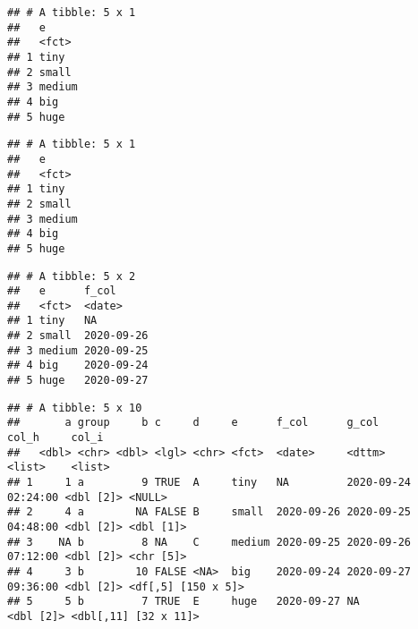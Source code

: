 \documentclass[
]{book}
\newenvironment{Shaded}{\begin{snugshade}}{\end{snugshade}}
\newcommand{\KeywordTok}[1]{\textcolor[rgb]{0.13,0.29,0.53}{\textbf{#1}}}
\newcommand{\NormalTok}[1]{#1}
\newcommand{\OperatorTok}[1]{\textcolor[rgb]{0.81,0.36,0.00}{\textbf{#1}}}
\newcommand{\StringTok}[1]{\textcolor[rgb]{0.31,0.60,0.02}{#1}}
\begin{document}
\begin{verbatim}
## # A tibble: 5 x 1
##   e     
##   <fct> 
## 1 tiny  
## 2 small 
## 3 medium
## 4 big   
## 5 huge
\end{verbatim}

\begin{Shaded}
\end{Shaded}

\begin{verbatim}
## # A tibble: 5 x 1
##   e     
##   <fct> 
## 1 tiny  
## 2 small 
## 3 medium
## 4 big   
## 5 huge
\end{verbatim}

\begin{Shaded}
\end{Shaded}

\begin{verbatim}
## # A tibble: 5 x 2
##   e      f_col     
##   <fct>  <date>    
## 1 tiny   NA        
## 2 small  2020-09-26
## 3 medium 2020-09-25
## 4 big    2020-09-24
## 5 huge   2020-09-27
\end{verbatim}

\begin{Shaded}
\end{Shaded}

\begin{verbatim}
## # A tibble: 5 x 10
##       a group     b c     d     e      f_col      g_col               col_h     col_i               
##   <dbl> <chr> <dbl> <lgl> <chr> <fct>  <date>     <dttm>              <list>    <list>              
## 1     1 a         9 TRUE  A     tiny   NA         2020-09-24 02:24:00 <dbl [2]> <NULL>              
## 2     4 a        NA FALSE B     small  2020-09-26 2020-09-25 04:48:00 <dbl [2]> <dbl [1]>           
## 3    NA b         8 NA    C     medium 2020-09-25 2020-09-26 07:12:00 <dbl [2]> <chr [5]>           
## 4     3 b        10 FALSE <NA>  big    2020-09-24 2020-09-27 09:36:00 <dbl [2]> <df[,5] [150 x 5]>  
## 5     5 b         7 TRUE  E     huge   2020-09-27 NA                  <dbl [2]> <dbl[,11] [32 x 11]>
\end{verbatim}
\end{document}
